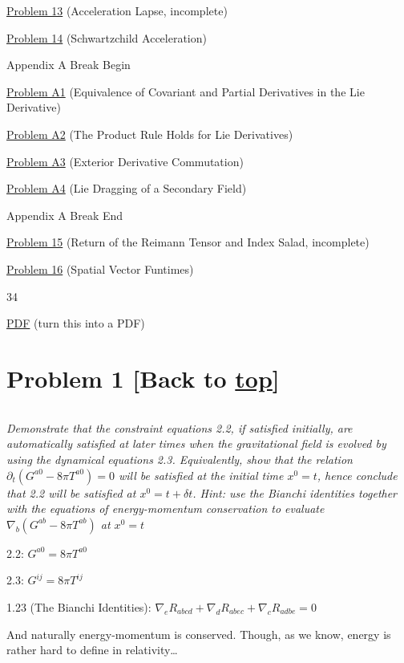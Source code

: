 \documentclass[landscape,letterpaper,10pt,english]{article}
\begin{document}
\hyperref[p13]{Problem 13} (Acceleration Lapse, incomplete)

\hyperref[p14]{Problem 14} (Schwartzchild Acceleration)

Appendix A Break Begin

\hyperref[pa1]{Problem A1} (Equivalence of Covariant and Partial
Derivatives in the Lie Derivative)

\hyperref[pa2]{Problem A2} (The Product Rule Holds for Lie Derivatives)

\hyperref[pa3]{Problem A3} (Exterior Derivative Commutation)

\hyperref[pa4]{Problem A4} (Lie Dragging of a Secondary Field)

Appendix A Break End

\hyperref[p15]{Problem 15} (Return of the Reimann Tensor and Index
Salad, incomplete)

\hyperref[p16]{Problem 16} (Spatial Vector Funtimes)

34

\hyperref[latex_pdf_output]{PDF} (turn this into a PDF)

    \hypertarget{problem-1-back-to-top}{%
\section{\texorpdfstring{Problem 1 {[}Back to
\hyperref[toc]{top}{]}}{Problem 1 {[}Back to {]}}}\label{problem-1-back-to-top}}

\[\label{P1}\]

\emph{Demonstrate that the constraint equations 2.2, if satisfied
initially, are automatically satisfied at later times when the
gravitational field is evolved by using the dynamical equations 2.3.
Equivalently, show that the relation
\(\partial_t (G^{a0} - 8\pi T^{a0}) = 0\) will be satisfied at the
initial time \(x^0=t\), hence conclude that 2.2 will be satisfied at
\(x^0 = t+\delta t\). Hint: use the Bianchi identities together with the
equations of energy-momentum conservation to evaluate
\(\nabla_b(G^{ab}-8\pi T^{ab})\) at \(x^0=t\)}

    2.2: \(G^{a0} = 8\pi T^{a0}\)

2.3: \(G^{ij} = 8\pi T^{ij}\)

1.23 (The Bianchi Identities):
\(\nabla_e R_{abcd} + \nabla_d R_{abec} + \nabla_c R_{adbe} = 0\)

And naturally energy-momentum is conserved. Though, as we know, energy
is rather hard to define in relativity\ldots{}
\end{document}
